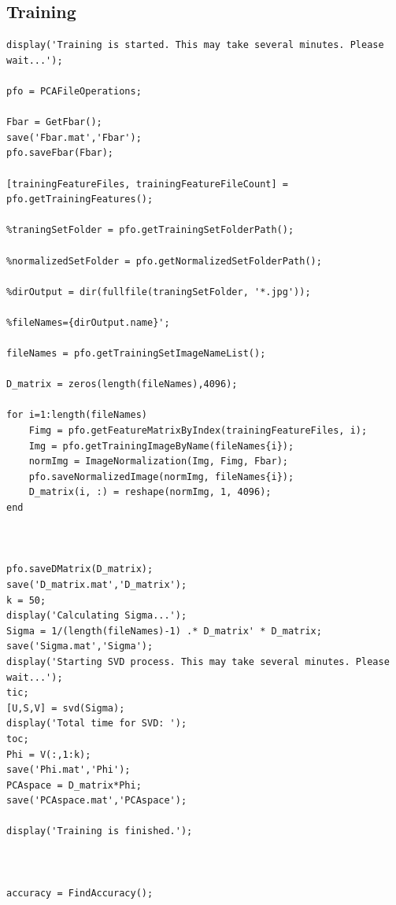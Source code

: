 \documentclass[]{article}
\begin{document}
\subsection*{Training}
\begin{verbatim}
display('Training is started. This may take several minutes. Please wait...');

pfo = PCAFileOperations;

Fbar = GetFbar();
save('Fbar.mat','Fbar');
pfo.saveFbar(Fbar);
    
[trainingFeatureFiles, trainingFeatureFileCount] = pfo.getTrainingFeatures();

%traningSetFolder = pfo.getTrainingSetFolderPath();

%normalizedSetFolder = pfo.getNormalizedSetFolderPath();

%dirOutput = dir(fullfile(traningSetFolder, '*.jpg'));

%fileNames={dirOutput.name}';

fileNames = pfo.getTrainingSetImageNameList();

D_matrix = zeros(length(fileNames),4096);

for i=1:length(fileNames)
    Fimg = pfo.getFeatureMatrixByIndex(trainingFeatureFiles, i);
    Img = pfo.getTrainingImageByName(fileNames{i});
    normImg = ImageNormalization(Img, Fimg, Fbar);
    pfo.saveNormalizedImage(normImg, fileNames{i});
    D_matrix(i, :) = reshape(normImg, 1, 4096);
end



pfo.saveDMatrix(D_matrix);
save('D_matrix.mat','D_matrix');
k = 50;
display('Calculating Sigma...');
Sigma = 1/(length(fileNames)-1) .* D_matrix' * D_matrix;
save('Sigma.mat','Sigma');
display('Starting SVD process. This may take several minutes. Please wait...');
tic;
[U,S,V] = svd(Sigma);
display('Total time for SVD: ');
toc;
Phi = V(:,1:k);
save('Phi.mat','Phi');
PCAspace = D_matrix*Phi;
save('PCAspace.mat','PCAspace');

display('Training is finished.');



accuracy = FindAccuracy();
\end{verbatim}
\end{document}

